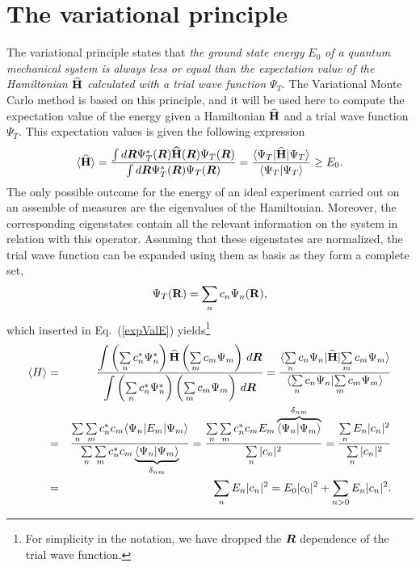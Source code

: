 \section{The variational principle}
The variational principle states that \emph{the ground state energy} $E_0$ \emph{of a quantum mechanical system is always less or equal than the expectation value of the Hamiltonian ${\bf\widehat{H}}$ calculated with a trial wave function} $\Psi_T$. The Variational Monte Carlo method is based on this principle, and it will be used here to compute the expectation value of the energy given a Hamiltonian ${\bf\widehat{H}}$ and a trial wave function $\Psi_T$. This expectation values is given the following expression
\begin{equation}\label{expValE}
\langle {\bf\widehat{H}} \rangle = \frac{\int d{\boldsymbol{R}}\Psi^{\ast}_T({\boldsymbol{R}}){\bf\widehat{H}}({\boldsymbol{R}})\Psi_T(\boldsymbol{R})}{\int d{\boldsymbol{R}}\Psi^{\ast}_T({\boldsymbol{R}})\Psi_T({\boldsymbol{R}})}= \frac{\langle{{\Psi_T}}|{\bf\widehat{H}}|{{\Psi_T}}\rangle}{\langle{{\Psi_T}}|{{\Psi_T}}\rangle} \geq E_0.
\end{equation}
The only possible outcome for the energy of an ideal experiment carried out on an assemble of measures are the eigenvalues of the Hamiltonian. Moreover, the corresponding eigenstates contain all the relevant information on the system in relation with this operator. Assuming that these eigenstates are normalized, the trial wave function can be expanded using them as basis as they form a complete set, 
$$
\Psi_T({\bf R})=\sum_n c_n\Psi_n({\bf R}),
$$
which inserted in Eq.~(\ref{expValE}) yields\footnote{For simplicity in the notation, we have dropped the $\boldsymbol{R}$ dependence of the trial wave function.}
\begin{eqnarray}\label{expHamiltonian}
   \langle H \rangle & = & \frac{{\displaystyle\int} \left(\sum\limits_{n}c_n^{\ast} \Psi_n^{\ast}\right) {\bf\widehat{H}}  \left(\sum\limits_m c_m\Psi_m\right) \, d{\boldsymbol{R}}}{{\displaystyle\int} \left(\sum\limits_{n}c_n^{\ast}\Psi^{\ast}_n\right)\left(\sum\limits_m c_m \Psi_m\right) \, d{\boldsymbol{R}}}
= \frac{\langle {\sum\limits_{n}c_n \Psi_n}|{\bf\widehat{H}}|{\sum\limits_{m}c_m \Psi_m\rangle}}{\langle{\sum\limits_{n}c_n\Psi_n}|{\sum\limits_{m}c_m\Psi_m}\rangle}\nonumber\\
 & = & \frac{\sum\limits_{n} \sum\limits_m c_n^{\ast}  c_m \langle {\Psi_n}|E_m|{\Psi_m\rangle}}{\sum\limits_{n} \sum\limits_m c_n^{\ast}  c_m \underbrace{\langle{\Psi_n}|{\Psi_m\rangle}}_{\delta_{nm}}} =  \frac{\sum\limits_{n} \sum\limits_m c_n^{\ast}  c_m E_m  \overbrace{\langle{\Psi_n}|{\Psi_m\rangle}}^{\delta_{nm}}}{\sum\limits_{n} |c_n|^2 } = \frac{\sum\limits_{n} E_n |c_n|^2}{\sum\limits_{n} |c_n|^2 } \nonumber\\
& = & \sum\limits_{n} E_n |c_n|^2 = E_0 |c_0|^2 + \sum\limits_{n>0} E_n |c_n|^2.
\end{eqnarray}
